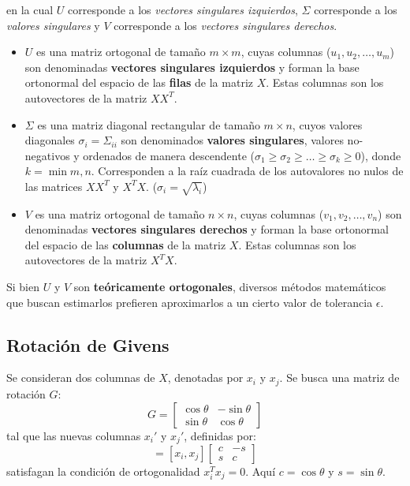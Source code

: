 \documentclass[a4paper]{article}
\begin{document}
en la cual $U$ corresponde a los \textit{vectores singulares izquierdos}, $\Sigma$ corresponde a los \textit{valores singulares} y 
$V$ corresponde a los \textit{vectores singulares derechos}.
\begin{itemize}
    \item $U$ es una matriz ortogonal de tamaño $m \times m$, cuyas columnas (${u_1,u_2,\dots,u_m}$) son denominadas \textbf{vectores singulares izquierdos} y forman la
    base ortonormal del espacio de las \textbf{filas} de la matriz $X$. Estas columnas son los autovectores de la matriz $XX^T$.
    \item $\Sigma$ es una matriz diagonal rectangular de tamaño $m \times n$, cuyos valores diagonales $\sigma_i = \Sigma_{ii}$ son denominados \textbf{valores singulares},
    valores no-negativos y ordenados de manera descendente ($\sigma_1 \geq \sigma_2 \geq \dots \geq \sigma_k \geq 0$), donde $k = \min{m,n}$. Corresponden a la raíz cuadrada de los
    autovalores no nulos de las matrices $XX^T$ y $X^TX$. ($\sigma_i = \sqrt{\lambda_i}$)
    \item $V$ es una matriz ortogonal de tamaño $n \times n$, cuyas columnas (${v_1, v_2,\dots,v_n}$) son denominadas \textbf{vectores singulares derechos} y forman la
    base ortonormal del espacio de las \textbf{columnas} de la matriz $X$. Estas columnas son los autovectores de la matriz $X^TX$.
\end{itemize}
Si bien $U$ y $V$ son \textbf{teóricamente ortogonales}, diversos métodos matemáticos que buscan estimarlos prefieren aproximarlos a un cierto valor de tolerancia $\epsilon$.
\subsection{Rotación de Givens}

Se consideran dos columnas de $X$, denotadas por $x_i$ y $x_j$. Se busca una matriz de rotación $G$:
\begin{equation}
    G = \left[ \begin{array}{cc}
        \cos \theta & -\sin \theta\\
        \sin \theta & \cos \theta
    \end{array} \right]
\end{equation}
tal que las nuevas columnas $x_i'$ y $x_j'$, definidas por:
\begin{equation}
    [x_i',x_j'] = [x_i,x_j] \left[ \begin{array}{cc}
        c & -s \\ s & c
    \end{array}\right]
\end{equation}
satisfagan la condición de ortogonalidad $x_i^T x_j = 0$. Aquí $c = \cos \theta$ y $s = \sin \theta$.
\end{document}

